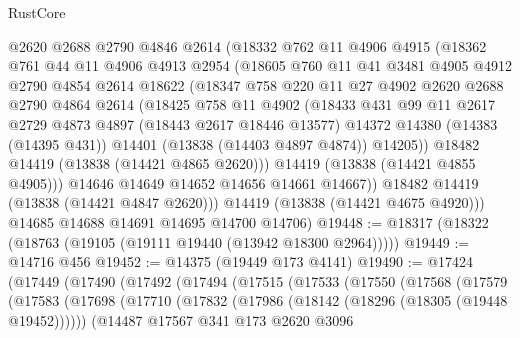 \begin{lexlean}{RustCore}
\begin{coremodule}
          @2620
          @2688
          @2790
          @4846
          @2614
          (@18332
            @762
            @11
            @4906
            @4915
            (@18362
              @761
              @44
              @11
              @4906
              @4913
              @2954
              (@18605
                @760
                @11
                @41
                @3481
                @4905
                @4912
                @2790
                @4854
                @2614
                @18622
                (@18347
                  @758
                  @220
                  @11
                  @27
                  @4902
                  @2620
                  @2688
                  @2790
                  @4864
                  @2614
                  (@18425
                    @758
                    @11
                    @4902
                    (@18433
                      @431
                      @99
                      @11
                      @2617
                      @2729
                      @4873
                      @4897
                      (@18443 @2617 @18446 @13577)
                      @14372
                      @14380
                      (@14383 (@14395 @431))
                      @14401
                      (@13838 (@14403 @4897 @4874))
                      @14205))
                  @18482
                  @14419
                  (@13838 (@14421 @4865 @2620)))
                @14419
                (@13838 (@14421 @4855 @4905)))
              @14646
              @14649
              @14652
              @14656
              @14661
              @14667))
          @18482
          @14419
          (@13838 (@14421 @4847 @2620)))
        @14419
        (@13838 (@14421 @4675 @4920)))
      @14685
      @14688
      @14691
      @14695
      @14700
      @14706)
@19448 := @18317 (@18322 (@18763 (@19105 (@19111 @19440 (@13942 @18300 @2964)))))
@19449 := @14716 @456
@19452 := @14375 (@19449 @173 @4141)
@19490 := @17424
    (@17449
      (@17490
        (@17492
          (@17494
            (@17515
              (@17533
                (@17550
                  (@17568
                    (@17579
                      (@17583
                        (@17698
                          (@17710
                            (@17832 (@17986 (@18142 (@18296 (@18305 (@19448 @19452))))))
                            (@14487
                              @17567
                              @341
                              @173
                              @2620
                              @3096

\end{coremodule}
\end{lexlean}
